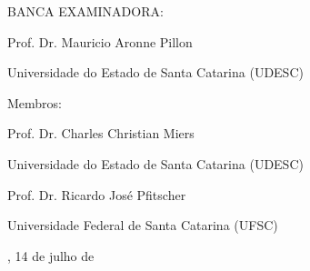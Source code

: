 

%
% 
%
\begin{folhadeaprovacao}



	\begin{center}
		{\selectfont\MakeTextUppercase{\normalsize\imprimirautor}}
	\end{center}
    \vfill
    
	\vfill
	\begin{center}
		{\selectfont\MakeTextUppercase{\imprimirtitulo}}
	\end{center}
	\vfill

    
%


\vfill
        
	 \begin{center}

    	{\selectfont BANCA EXAMINADORA: }
    	\vspace*{1.75cm}

		Prof. Dr. Mauricio Aronne Pillon \par
		Universidade do Estado de Santa Catarina (UDESC)
	 \end{center}

    {Membros:}

	\begin{center}
		\vspace*{1.25cm}
		Prof. Dr. Charles Christian Miers \par
		Universidade do Estado de Santa Catarina (UDESC)

		\vspace*{1.25cm}
		Prof. Dr. Ricardo José Pfitscher \par
		Universidade Federal de Santa Catarina (UFSC)


	\end{center}

    \vspace*{\fill}
    \begin{center}
    {\imprimirlocal, 14 de julho de \imprimirdata}
	\end{center}
    \vspace*{0.25cm}  
\end{folhadeaprovacao}




